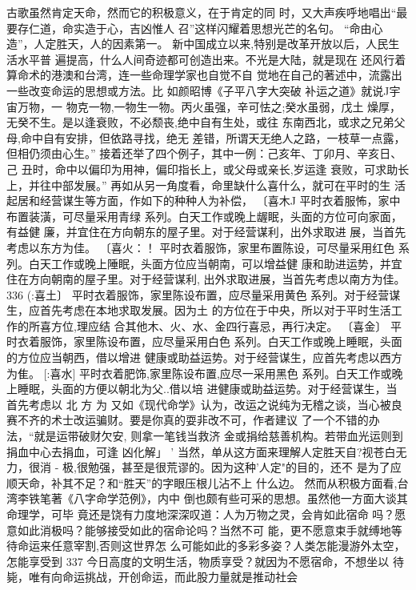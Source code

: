古歌虽然肯定天命，然而它的积极意义，在于肯定的同
时，又大声疾呼地唱出“最要存仁道，命实造于心，吉凶惟人
召”这样闪耀着思想光芒的名句。
“命由心造”，人定胜天，人的因素第一。
新中国成立以来,特别是改革开放以后，人民生活水平普
遍提高，什么人间奇迹都可创造出来。不光是大陆，就是现在
还风行着算命术的港澳和台湾，连一些命理学家也自觉不自
觉地在自己的著述中，流露出一些改变命运的思想或方法。比
如颜昭博《子平八字大突破 补运之道》就说J宇宙万物，一 物克一物,一物生一物。丙火虽强，辛可怯之;癸水虽弱，戊土
燥厚，无癸不生。是以逢衰败，不必颓丧,绝中自有生处，或往
东南西北，或求之兄弟父母,命中自有安排，但依路寻找，绝无
差错，所谓天无绝人之路，一枝草一点露，但相仍须由心生。”
接着还举了四个例子，其中一例：己亥年、丁卯月、辛亥日、己
丑时，命中以偏印为用神，偏印指长上，或父母或亲长,岁运逢
衰败，可求助长上，并往中部发展。”
再如从另一角度看，命里缺什么喜什么，就可在平时的生
活起居和经营谋生等方面，作如下的种种人为补偿，
〔喜木J 平时衣着服怖，家中布置装潢，可尽量采用青绿
系列。白天工作或晚上龌眠，头面的方位可向家面，有益健
廉，并宜住在方向朝东的屋子里。对于经营谋利，出外求取进
展，当首先考虑以东方为佳。
〔喜火：！ 平时衣着服饰，家里布置陈设，可尽量采用红色
系列。白天工作或晚上陲眠，头面方位应当朝南，可以增益健
康和助进运势，并宜住在方向朝南的屋子里。对于经营谋利,
出外求取进展，当首先考虑以南方为佳。
336
(:喜土〕 平时衣着服饰，家里陈设布置，应尽量采用黄色
系列。对于经营谋生，应首先考虑在本地求取发展。因为土
的方位在于中央，所以对于平时生活工作的所喜方位,理应结
合其他木、火、水、金四行喜忌，再行决定。
〔喜金〕 平时衣着服饰，家里陈设布置，应尽量采用白色
系列。白天工作或晚上睡眠，头面的方位应当朝西，借以增进
健康或助益运势。对于经营谋生，应首先考虑以西方为隹。
[:喜水] 平时衣着肥饰,家里陈设布置,应尽一采用黑色
系列。白天工作或晚上睡眠，头面的方便以朝北为父..借以培
进健康或助益运势。对于经营谋生，当 首先考虑以 北 方 为
又如《现代命学》认为，改运之说纯为无稽之谈，当心被良
赛不齐的术士改运骗财。要是你真的耍非改不可，作者建议
了一个不错的办法，“就是运带破财欠安, 则拿一笔钱当救济
金或捐给慈善机构。若带血光运则到捐血中心去捐血，可逢
凶化解」 '
当然，单从这方面来理解人定胜天自?视苍白无力，很消
- 极,很勉强，甚至是很荒谬的。因为这种'人定"的目的，还不
是为了应顺天命，补其不足？和“胜天”的字眼压根儿沾不上
什么边。
然而从积极方面看,台湾李铁笔著《八字命学范例》，内中
倒也颇有些可采的思想。虽然他一方面大谈其命理学，可毕
竟还是饶有力度地深深叹道：人为万物之灵，会肯如此宿命
吗？愿意如此消极吗？能够接受如此的宿命论吗？当然不可
能，更不愿意束手就缚地等待命运来任意宰割,否则这世界怎
么可能如此的多彩多姿？人类怎能漫游外太空，怎能享受到
 337 
今日高度的文明生活，物质享受？就因为不愿宿命，不想坐以
待毙，唯有向命运挑战，开创命运，而此股力量就是推动社会
